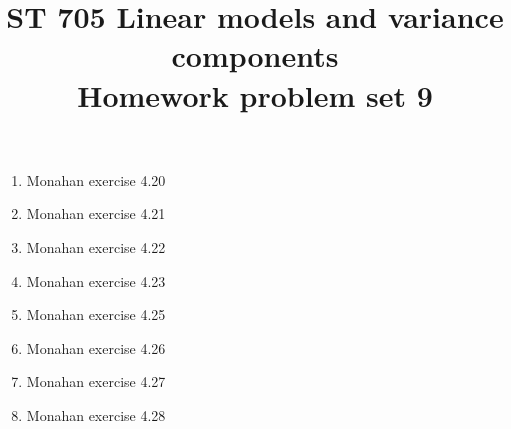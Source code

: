 \documentclass[11pt]{article}
\title{ST 705 Linear models and variance components \\ 
        Homework problem set 9}
\begin{document}
\maketitle

\begin{enumerate}

\item Monahan exercise 4.20

\item Monahan exercise 4.21

\item Monahan exercise 4.22

\item Monahan exercise 4.23

\item Monahan exercise 4.25

\item Monahan exercise 4.26

\item Monahan exercise 4.27

\item Monahan exercise 4.28

\end{enumerate}
\end{document}
